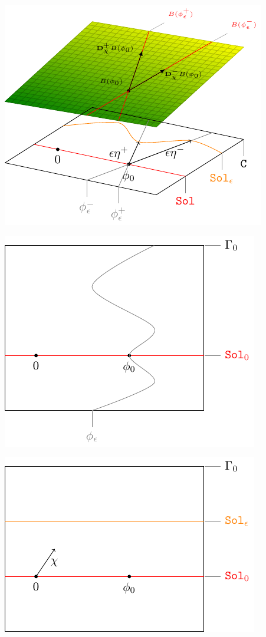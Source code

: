 \documentclass{article}
\begin{document}
	\includegraphics[width=\textwidth]{../Pictures/GeometricPictureLinear1}
				
	\includegraphics[width=\textwidth]{../Pictures/compsupp_GeometricPicture0}
				
	\includegraphics[width=\textwidth]{../Pictures/compsupp_GeometricPicture1}
				
\end{document}

